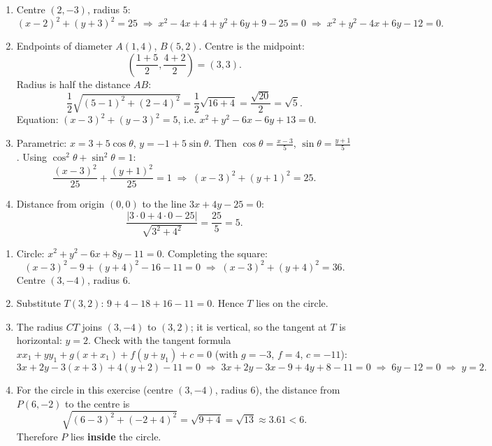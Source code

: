 \documentclass[11pt]{article}
\begin{document}
\begin{corrige}
\begin{enumerate}
\item Centre $(2,-3)$, radius $5$:
\[
(x-2)^{2}+(y+3)^{2}=25 \;\Longrightarrow\; x^{2}-4x+4+y^{2}+6y+9-25=0 \;\Longrightarrow\; x^{2}+y^{2}-4x+6y-12=0.
\]
\item Endpoints of diameter $A(1,4)$, $B(5,2)$. Centre is the midpoint:
\[
\left(\frac{1+5}{2},\frac{4+2}{2}\right)=(3,3).
\]
Radius is half the distance $AB$:
\[
\frac{1}{2}\sqrt{(5-1)^{2}+(2-4)^{2}}=\frac{1}{2}\sqrt{16+4}=\frac{\sqrt{20}}{2}=\sqrt{5}.
\]
Equation: $(x-3)^{2}+(y-3)^{2}=5$, i.e. $x^{2}+y^{2}-6x-6y+13=0$.
\item Parametric: $x=3+5\cos\theta$, $y=-1+5\sin\theta$. Then $\cos\theta=\frac{x-3}{5}$, $\sin\theta=\frac{y+1}{5}$. Using $\cos^{2}\theta+\sin^{2}\theta=1$:
\[
\frac{(x-3)^{2}}{25}+\frac{(y+1)^{2}}{25}=1 \;\Longrightarrow\; (x-3)^{2}+(y+1)^{2}=25.
\]
\item Distance from origin $(0,0)$ to the line $3x+4y-25=0$:
\[
\frac{|3\cdot0+4\cdot0-25|}{\sqrt{3^{2}+4^{2}}}=\frac{25}{5}=5.
\]
\end{enumerate}
\end{corrige}

\begin{corrige}
\begin{enumerate}
\item Circle: $x^{2}+y^{2}-6x+8y-11=0$. Completing the square:
\[
(x-3)^{2}-9+(y+4)^{2}-16-11=0 \;\Longrightarrow\; (x-3)^{2}+(y+4)^{2}=36.
\]
Centre $(3,-4)$, radius $6$.
\item Substitute $T(3,2)$: $9+4-18+16-11=0$. Hence $T$ lies on the circle.
\item The radius $CT$ joins $(3,-4)$ to $(3,2)$; it is vertical, so the tangent at $T$ is horizontal: $y=2$.
Check with the tangent formula $xx_{1}+yy_{1}+g(x+x_{1})+f(y+y_{1})+c=0$ (with $g=-3$, $f=4$, $c=-11$):
\[
3x+2y-3(x+3)+4(y+2)-11=0 \;\Longrightarrow\; 3x+2y-3x-9+4y+8-11=0 \;\Longrightarrow\; 6y-12=0 \;\Longrightarrow\; y=2.
\]
\item For the circle in this exercise (centre $(3,-4)$, radius $6$), the distance from $P(6,-2)$ to the centre is
\[
\sqrt{(6-3)^{2}+(-2+4)^{2}}=\sqrt{9+4}=\sqrt{13}\approx 3.61 < 6.
\]
Therefore $P$ lies \textbf{inside} the circle.
\end{enumerate}
\end{corrige}
\end{document}
